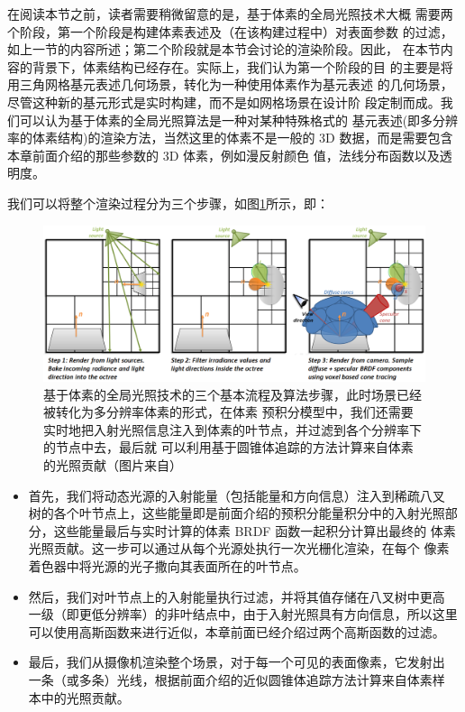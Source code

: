 在阅读本节之前，读者需要稍微留意的是，基于体素的全局光照技术大概 需要两个阶段，第一个阶段是构建体素表述及（在该构建过程中）对表面参数 的过滤，如上一节的内容所述；第二个阶段就是本节会讨论的渲染阶段。因此， 在本节内容的背景下，体素结构已经存在。实际上，我们认为第一个阶段的目 的主要是将用三角网格基元表述几何场景，转化为一种使用体素作为基元表述 的几何场景，尽管这种新的基元形式是实时构建，而不是如网格场景在设计阶 段定制而成。我们可以认为基于体素的全局光照算法是一种对某种特殊格式的 基元表述(即多分辨率的体素结构)的渲染方法，当然这里的体素不是一般的 3D 数据，而是需要包含本章前面介绍的那些参数的 3D 体素，例如漫反射颜色 值，法线分布函数以及透明度。

我们可以将整个渲染过程分为三个步骤，如图\ref{f:vct-steps}所示，即：

\begin{figure}
\begin{fullwidth}
	\includegraphics[width=\thewidth]{figures/vct/vct-3}
	\caption{基于体素的全局光照技术的三个基本流程及算法步骤，此时场景已经被转化为多分辨率体素的形式，在体素 预积分模型中，我们还需要实时地把入射光照信息注入到体素的叶节点，并过滤到各个分辨率下的节点中去，最后就 可以利用基于圆锥体追踪的方法计算来自体素的光照贡献（图片来自\cite{a:InteractiveIndirectIlluminationUsingVoxelConeTracing}）}
	\label{f:vct-steps}
\end{fullwidth}
\end{figure}


\begin{itemize}
	\item 首先，我们将动态光源的入射能量（包括能量和方向信息）注入到稀疏八叉 树的各个叶节点上，这些能量即是前面介绍的预积分能量积分中的入射光照部分，这些能量最后与实时计算的体素 BRDF 函数一起积分计算出最终的 体素光照贡献。这一步可以通过从每个光源处执行一次光栅化渲染，在每个 像素着色器中将光源的光子撒向其表面所在的叶节点。
	\item 然后，我们对叶节点上的入射能量执行过滤，并将其值存储在八叉树中更高 一级（即更低分辨率）的非叶结点中，由于入射光照具有方向信息，所以这里 可以使用高斯函数来进行近似，本章前面已经介绍过两个高斯函数的过滤。
	\item 最后，我们从摄像机渲染整个场景，对于每一个可见的表面像素，它发射出 一条（或多条）光线，根据前面介绍的近似圆锥体追踪方法计算来自体素样 本中的光照贡献。
\end{itemize}

